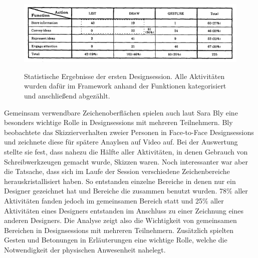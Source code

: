 \begin{figure}
        {\includegraphics[width=1\linewidth]{gfx/Abb3}}
		\caption[Statistische Ergebnisse der ersten Designsession.]{Statistische Ergebnisse der ersten Designsession. Alle Aktivitäten wurden dafür im Framework anhand der Funktionen kategorisiert und anschließend abgezählt.}\label{fig:Abbildung3}
\end{figure}
\clearpage

\medskip Gemeinsam verwendbare Zeichenoberflächen spielen auch laut Sara Bly \cite{Bly:1988:UDS:62266.62286} eine besonders wichtige Rolle in Designsessions mit mehreren Teilnehmern. 
Bly beobachtete das Skizzierverhalten zweier Personen in Face-to-Face Designsessions und zeichnete diese für spätere Anaylsen auf Video auf. Bei der Auswertung stellte sie fest, dass nahezu die Hälfte aller Aktivitäten, in denen Gebrauch von Schreibwerkzeugen gemacht wurde, Skizzen waren. Noch interessanter war aber die Tatsache, dass sich im Laufe der Session verschiedene Zeichenbereiche herauskristallisiert haben. So entstanden einzelne Bereiche in denen nur ein Designer gezeichnet hat und Bereiche die zusammen benutzt wurden. 78\% aller Aktivitäten fanden jedoch im gemeinsamen Bereich statt und 25\% aller Aktivitäten eines Designers entstanden im Anschluss zu einer Zeichnung eines anderen Designers. Die Analyse zeigt also die Wichtigkeit von gemeinsamen Bereichen in Designsessions mit mehreren Teilnehmern. Zusätzlich spielten Gesten und Betonungen in Erläuterungen eine wichtige Rolle, welche die Notwendigkeit der physischen Anwesenheit nahelegt.

